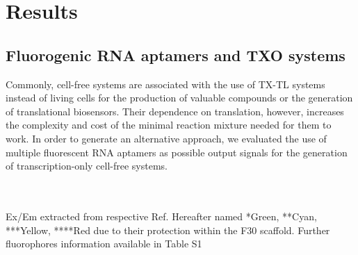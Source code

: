 \section*{Results}
\subsection*{Fluorogenic RNA aptamers and TXO systems}

Commonly, cell-free systems are associated with the use of TX-TL systems instead of living cells for the production of valuable compounds or the generation of translational biosensors. Their dependence on translation, however, increases the complexity and cost of the minimal reaction mixture needed for them to work. In order to generate an alternative approach, we evaluated the use of multiple fluorescent RNA aptamers as possible output signals for the generation of transcription-only cell-free systems.

\begin{table}[h]
{\\
\\Ex/Em extracted from respective Ref. 
Hereafter named *Green, **Cyan, ***Yellow, ****Red due to their protection within the F30 scaffold. Further  fluorophores information   available in Table S1}
\end{table}

